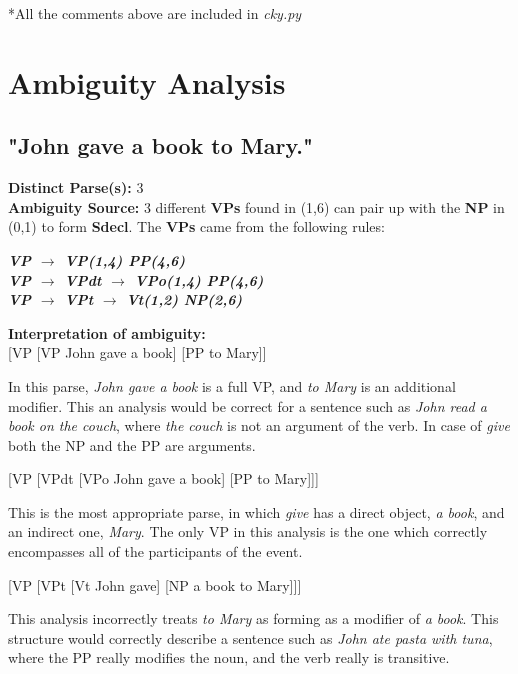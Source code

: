 \documentclass{article}
\begin{document}
*All the comments above are included in \textit{cky.py}

\hfill \break


\section{Ambiguity Analysis}

\subsection{"John gave a book to Mary."}

\textbf{Distinct Parse(s):} 3\\

\textbf{Ambiguity Source:} 3 different \textbf{VPs} found in (1,6) can pair up with the \textbf{NP} in (0,1) to form \textbf{Sdecl}. The \textbf{VPs} came from the following rules:

\begin{center}
	\textbf{\emph{VP $\rightarrow$ VP(1,4) PP(4,6)}\\
	\emph{VP $\rightarrow$ VPdt $\rightarrow$ VPo(1,4) PP(4,6)}\\
	\emph{VP $\rightarrow$ VPt $\rightarrow$ Vt(1,2) NP(2,6)}}
\end{center}

\textbf{Interpretation of ambiguity:}\\
{[}VP {[}VP John gave a book{]} {[}PP to Mary{]}{]}

In this parse, \emph{John gave a book} is a full VP, and \emph{to Mary} is an additional modifier. This an analysis would be correct for a sentence such as \emph{John read a book on the couch}, where \emph{the couch} is not an argument of the verb. In case of \emph{give} both the NP and the PP are arguments.

[VP [VPdt [VPo John gave a book] [PP to Mary]]]

This is the most appropriate parse, in which \emph{give} has a direct object, \emph{a book}, and an indirect one, \emph{Mary}. The only VP in this analysis is the one which correctly encompasses all of the participants of the event.

[VP [VPt [Vt John gave] [NP a book to Mary]]]

This analysis incorrectly treats \emph{to Mary} as forming as a modifier of \emph{a book}. This structure would correctly describe a sentence such as \emph{John ate pasta with tuna}, where the PP really modifies the noun, and the verb really is transitive.
\end{document}

